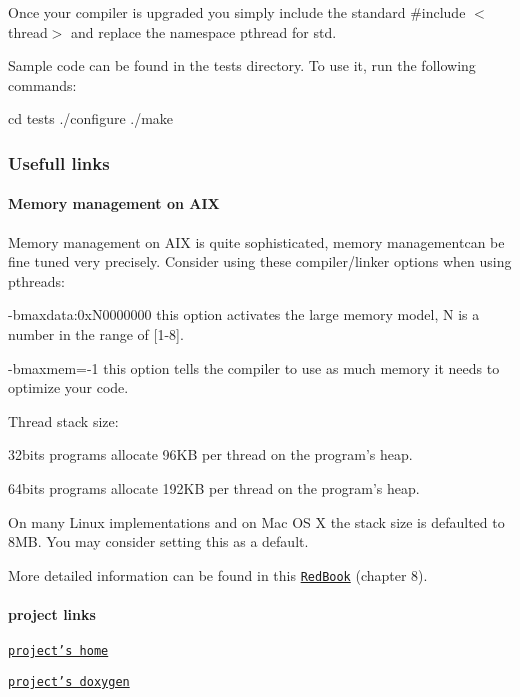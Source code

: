 Once your compiler is upgraded you simply include the standard {\ttfamily \#include $<$thread$>$} and replace the namespace {\ttfamily pthread} for {\ttfamily std}.

Sample code can be found in the {\ttfamily tests} directory. To use it, run the following commands\+:

cd tests ./configure ./make

\subsubsection*{Usefull links}

\paragraph*{Memory management on A\+I\+X}

Memory management on A\+I\+X is quite sophisticated, memory managementcan be fine tuned very precisely. Consider using these compiler/linker options when using pthreads\+:
\begin{DoxyItemize}
\item -\/bmaxdata\+:0x\+N0000000 this option activates the large memory model, N is a number in the range of \mbox{[}1-\/8\mbox{]}.
\item -\/bmaxmem=-\/1 this option tells the compiler to use as much memory it needs to optimize your code.
\end{DoxyItemize}

Thread stack size\+:
\begin{DoxyItemize}
\item 32bits programs allocate 96\+K\+B per thread on the program's heap.
\item 64bits programs allocate 192\+K\+B per thread on the program's heap.
\end{DoxyItemize}

On many Linux implementations and on Mac O\+S X the stack size is defaulted to 8\+M\+B. You may consider setting this as a default.

More detailed information can be found in this \href{http://www.redbooks.ibm.com/redbooks/pdfs/sg245674.pdf}{\tt Red\+Book} (chapter 8).

\paragraph*{project links}


\begin{DoxyItemize}
\item \href{https://github.com/HerbertKoelman/cpp-pthread}{\tt project's home}
\item \href{http://herbertkoelman.github.io/cpp-pthread/doc/html/}{\tt project's doxygen}
\end{DoxyItemize}

